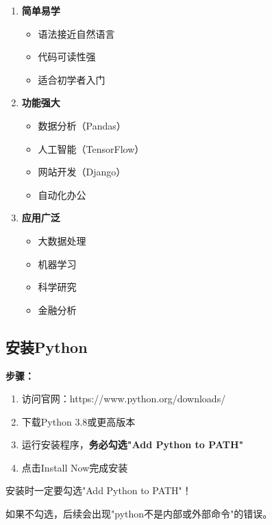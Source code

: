 \documentclass[12pt,a4paper]{article}
\begin{document}
\begin{knowledgebox}[Python的特点]
\begin{enumerate}
    \item \textbf{简单易学}
    \begin{itemize}
        \item 语法接近自然语言
        \item 代码可读性强
        \item 适合初学者入门
    \end{itemize}
    
    \item \textbf{功能强大}
    \begin{itemize}
        \item 数据分析（Pandas）
        \item 人工智能（TensorFlow）
        \item 网站开发（Django）
        \item 自动化办公
    \end{itemize}
    
    \item \textbf{应用广泛}
    \begin{itemize}
        \item 大数据处理
        \item 机器学习
        \item 科学研究
        \item 金融分析
    \end{itemize}
\end{enumerate}
\end{knowledgebox}

\subsection{安装Python}

\textbf{步骤：}
\begin{enumerate}
    \item 访问官网：https://www.python.org/downloads/
    \item 下载Python 3.8或更高版本
    \item 运行安装程序，\textbf{务必勾选"Add Python to PATH"}
    \item 点击Install Now完成安装
\end{enumerate}

\begin{tipbox}[重要提示]
安装时一定要勾选"Add Python to PATH"！

如果不勾选，后续会出现"python不是内部或外部命令"的错误。
\end{tipbox}
\end{document}
